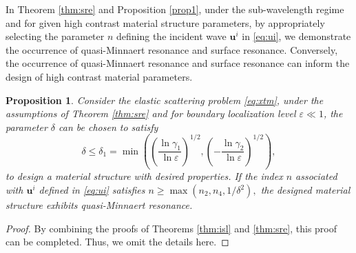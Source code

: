 \documentclass[11pt,reqno,twoside]{amsart}
\newtheorem{prop}{Proposition}[section]
\theoremstyle{definition}
\theoremstyle{remark}
\numberwithin{equation}{section}
\newcommand{\bu}{\mathbf{u}}
\begin{document}
			In  Theorem \ref{thm:sre} and  Proposition \ref{prop1}, under the sub-wavelength regime and for given high contrast material structure parameters, by appropriately selecting the parameter \(n\) defining the incident wave \(\bu^i\) in \eqref{eq:ui}, we demonstrate the occurrence of quasi-Minnaert resonance and surface resonance. Conversely, the occurrence of quasi-Minnaert resonance and surface resonance can inform the design of high contrast material parameters.
			\begin{prop}\label{prop:4.2}
				Consider the elastic scattering problem \eqref{eq:xtm}, under the assumptions of Theorem \ref{thm:sre}	and for boundary localization level \( \varepsilon\ll1 \), the parameter \(\delta\) can be chosen to satisfy 
				\[\delta\leq\delta_{1}=\min\left(\left(\frac{\ln\gamma_{1}}{\ln\varepsilon}\right)^{1/2},\left(-\frac{\ln\gamma_{2}}{\ln\varepsilon}\right)^{1/2}\right),\]
				to design a material structure with desired properties. If the index \(n\) associated with \(\bu^i\) defined in \eqref{eq:ui} satisfies
				$ n\geq\max\left({n_{2},n_{4},1/\delta^2}\right),$
				the designed material structure exhibits quasi-Minnaert resonance.
			\end{prop}
			\begin{proof}
				By combining the proofs of  Theorems \ref{thm:isl} and \ref{thm:sre}, this proof can be completed. Thus, we omit the details here.
			\end{proof}
			
\end{document}
